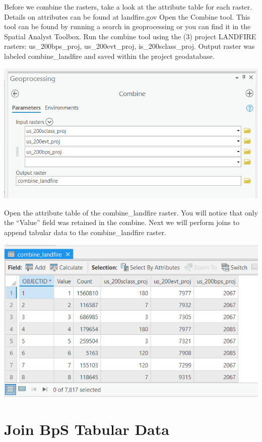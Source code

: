 \documentclass[
]{book}
\begin{document}
Before we combine the rasters, take a look at the attribute table for each raster. Details on attributes can be found at landfire.gov
Open the Combine tool. This tool can be found by running a search in geoprocessing or you can find it in the Spatial Analyst Toolbox. Run the combine tool using the (3) project LANDFIRE rasters: us\_200bps\_proj, us\_200evt\_proj, is\_200sclass\_proj. Output raster was labeled combine\_landfire and saved within the project geodatabase.

\includegraphics[width=1000pt]{04_gis_screenshots/6_combine_rasters}

Open the attribute table of the combine\_landfire raster. You will notice that only the ``Value'' field was retained in the combine. Next we will perform joins to append tabular data to the combine\_landfire raster.

\includegraphics[width=1000pt]{04_gis_screenshots/7_combine_noattributes}

\hypertarget{join-bps-tabular-data}{%
\section{Join BpS Tabular Data}\label{join-bps-tabular-data}}
\end{document}
